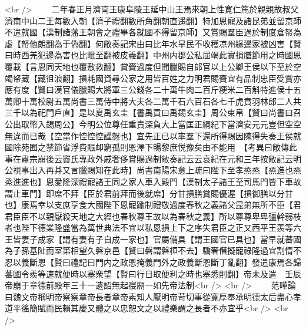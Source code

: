 <br />
　　二年春正月濟南王康阜陵王延中山王焉來朝上性寛仁篤於親親故叔父濟南中山二王每數入朝【濟子禮翻數所角翻朝直遥翻】特加恩寵及諸昆弟並留京師不遣就國【漢制諸藩王朝會之禮畢各就國不得留京師】又賞賜羣臣過於制度倉帑為虚【帑他朗翻為于偽翻】何敞奏記宋由曰比年水旱民不收穫凉州緣邊家被凶害【賢曰時西羌犯邊為害也比毗至翻被皮義翻】中州内郡公私屈竭此實損膳節用之時國恩覆載【言恩同天地也覆敷救翻】賞賚過度但聞臘賜自郎官以上公卿王侯以下至於空竭帑藏【藏徂浪翻】損耗國資尋公家之用皆百姓之力明君賜賚宜有品制忠臣受賞亦應有度【賢曰漢官儀臘賜大將軍三公錢各二十萬牛肉二百斤粳米二百斛特進侯十五萬卿十萬校尉五萬尚書三萬侍中將大夫各二萬千石六百石各七千虎賁羽林郎二人共三千以為祀門戶直】是以夏禹玄圭【書禹貢曰禹錫玄圭】周公束帛【賢曰尚書曰召公出取幣入錫周公】今明公位尊任重責深負大上當匡正綱紀下當濟安元元豈但空空無違而已哉【空當作悾悾悾謹慤也】宜先正已以率羣下還所得賜因陳得失奏王侯就國除苑囿之禁節省浮費賑卹窮孤則恩澤下暢黎庶悦豫矣由不能用　【考異曰敞傳此事在肅宗崩後云竇氏專政外戚奢侈賞賜過制敞奏記云云袁紀在元和三年按敞記云明公視事出入再朞又言臘賜知在此時】尚書南陽宋意上疏曰陛下至孝烝烝【烝進也烝烝進進也】恩愛隆深禮寵諸王同之家人車入殿門【漢制太子諸王至司馬門皆下車故謂止車門】即席不拜【臣於君前拜而後就席】分甘損膳賞賜優渥【損御膳以分甘也】康焉幸以支庶享食大國陛下恩寵踰制禮敬過度春秋之義諸父昆弟無所不臣【君君臣臣不以親厭殺天地之大經也春秋尊王故以為春秋之義】所以尊尊卑卑彊幹弱枝者也陛下德業隆盛當為萬世典法不宜以私恩損上下之序失君臣之正又西平王羨等六王皆妻子成家【謂有妻有子自成一家也】官屬備具【謂王國官已具也】當早就蕃國為子孫基阯而室第相望久磐京邑【賢曰磐謂磐桓不去】驕奢僭擬寵祿隆過宜割情不忍以義斷恩【賢曰禮記曰門内之政恩掩義門外之政義斷恩斷丁亂翻】發遣康焉各歸蕃國令羨等速就便時以塞衆望【賢曰行日取便利之時也塞悉則翻】帝未及遣　壬辰帝崩于章德前殿年三十一遺詔無起寑廟一如先帝法制<br />
<br />
　　范曄論曰魏文帝稱明帝察察章帝長者章帝素知人厭明帝苛切事從寛厚奉承明德太后盡心孝道平徭簡賦而民賴其慶又體之以忠恕文之以禮樂謂之長者不亦宜乎<br />
<br />
